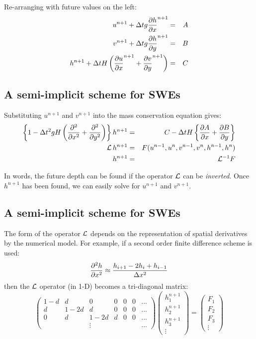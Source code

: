 Re-arranging with future values on the left:
\begin{eqnarray*}
	u^{n+1}+\Delta t g \frac{\partial h}{\partial x}^{n+1} & = & A \\
	v^{n+1}+\Delta t g \frac{\partial h}{\partial y}^{n+1} & = & B \\
	h^{n+1}+\Delta t H \left( \frac{\partial u}{\partial x}^{n+1}+\frac{\partial v}{\partial y}^{n+1} \right) & = & C
\end{eqnarray*}

\subsection{A semi-implicit scheme for SWEs}

Substituting $u^{n+1}$ and $v^{n+1}$ into the mass conservation
equation gives:
\begin{eqnarray*}
	\left\{ 1-\Delta t^2 gH \left( \frac{\partial ^2}{\partial x^2}+\frac{\partial ^2}{\partial y^2} \right) 
	\right\} h^{n+1}
	& = & C-\Delta t H \left\{ \frac{\partial A}{\partial x}+\frac{\partial B}{\partial y} \right\} \\
	{\cal L}\,h^{n+1} & = & F(u^{n-1},u^n,v^{n-1},v^n,h^{n-1},h^n) \\
	h^{n+1} & = & {\cal L}^{-1} F
\end{eqnarray*}

In words, the future depth can be found if the operator $\cal{L}$ can be
{\em inverted}. Once $h^{n+1}$ has been found, we can easily solve for
$u^{n+1}$ and $v^{n+1}$. 


\subsection{A semi-implicit scheme for SWEs}
The form of the operator $\cal{L}$ depends on the
representation of spatial derivatives by the numerical model. For
example, if a second order finite difference scheme is used:
\begin{equation}
	\frac{\partial ^2 h}{\partial x^2}\approx \frac{h_{i+1}-2h_i+h_{i-1}}{\Delta x^2}
\end{equation}
then the $\cal{L}$ operator (in 1-D) becomes a tri-diagonal matrix:
\begin{equation}
	\left(
	\begin{array}{ccccccc}
		1-d & d & 0 & 0 & 0 & 0 & ... \\
		d & 1-2d & d & 0 & 0 & 0 & ... \\
		0 & d & 1-2d & d & 0 & 0 & ... \\
		& & \vdots & & & & ... 
	\end{array}
	\right) \left(
	\begin{array}{c}
		h^{n+1}_1 \\
		h^{n+1}_2 \\
		h^{n+1}_3 \\
		\vdots
	\end{array}
	\right) = \left(
	\begin{array}{c}
		F_1 \\
		F_2 \\
		F_3 \\
		\vdots
	\end{array}
	\right)
\end{equation}

